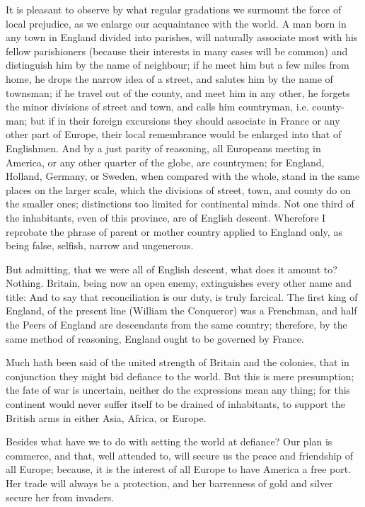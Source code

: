 \documentclass[12pt,oneside]{memoir}
\begin{document}
It is pleasant to observe by what regular gradations we surmount the
force of local prejudice, as we enlarge our acquaintance with the
world. A man born in any town in England divided into parishes, will
naturally associate most with his fellow parishioners (because their
interests in many cases will be common) and distinguish him by the
name of neighbour; if he meet him but a few miles from home, he
drops the narrow idea of a street, and salutes him by the name of
townsman; if he travel out of the county, and meet him in any other,
he forgets the minor divisions of street and town, and calls him
countryman, i.e. county-man; but if in their foreign excursions they
should associate in France or any other part of Europe, their local
remembrance would be enlarged into that of Englishmen. And by a just
parity of reasoning, all Europeans meeting in America, or any other
quarter of the globe, are countrymen; for England, Holland, Germany,
or Sweden, when compared with the whole, stand in the same places on
the larger scale, which the divisions of street, town, and county do
on the smaller ones; distinctions too limited for continental minds.
Not one third of the inhabitants, even of this province, are of
English descent. Wherefore I reprobate the phrase of parent or
mother country applied to England only, as being false, selfish,
narrow and ungenerous.

But admitting, that we were all of English descent, what does it
amount to? Nothing. Britain, being now an open enemy, extinguishes
every other name and title: And to say that reconciliation is our
duty, is truly farcical. The first king of England, of the present
line (William the Conqueror) was a Frenchman, and half the Peers of
England are descendants from the same country; therefore, by the
same method of reasoning, England ought to be governed by France.

Much hath been said of the united strength of Britain and the
colonies, that in conjunction they might bid defiance to the world.
But this is mere presumption; the fate of war is uncertain, neither
do the expressions mean any thing; for this continent would never
suffer itself to be drained of inhabitants, to support the British
arms in either Asia, Africa, or Europe.

Besides what have we to do with setting the world at defiance? Our
plan is commerce, and that, well attended to, will secure us the
peace and friendship of all Europe; because, it is the interest of
all Europe to have America a free port. Her trade will always be a
protection, and her barrenness of gold and silver secure her from
invaders.
\end{document}
